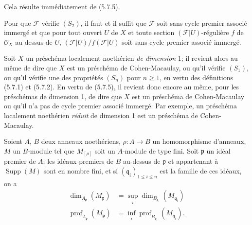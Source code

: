 Cela résulte immédiatement de (5.7.5).

\begin{corollary}[5.7.7]
\label{IV.2.s5.7.7-fr}
Pour que $\mathscr F$ vérifie $(S_2)$, il faut et il suffit que $\mathscr F$
soit sans cycle premier associé immergé et que pour tout ouvert $U$ de $X$
et toute section $(\mathscr F|U)$-régulière $f$ de $\mathcal O_X$ au-dessus
de $U$, $(\mathscr F|U)/f(\mathscr F|U)$ soit sans cycle premier associé
immergé.
\end{corollary}


\begin{remarks}[5.7.8]
\label{IV.2.s5.7.8-fr}
Soit $X$ un préschéma localement noethérien \emph{de dimension} 1; il revient alors
au même de dire que $X$ est un préschéma de Cohen-Macaulay, ou qu'il vérifie
$(S_1)$, ou qu'il vérifie une des propriétés $(S_n)$ pour $n\geq1$, en vertu
des définitions (5.7.1) et (5.7.2). En vertu de (5.7.5), il revient donc
encore au même, pour les préschémas de dimension 1, de dire que $X$ est un
préschéma de Cohen-Macaulay ou qu'il n'a pas de cycle premier associé
immergé. Par exemple, un préschéma localement noethérien \emph{réduit} de dimension
1 est un préschéma de Cohen-Macaulay.
\end{remarks}

\begin{proposition}[5.7.9]
\label{IV.2.s5.7.9-fr}
Soient $A$, $B$ deux anneaux noethériens, $\rho:A\to B$ un homomorphisme
d'anneaux, $M$ un $B$-module tel que $M_{[\rho]}$ soit un $A$-module de type
fini. Soit $\mathfrak p$ un idéal premier de $A$; les idéaux premiers de $B$
au-dessus de $\mathfrak p$ et appartenant à $\operatorname{Supp}(M)$ sont en
nombre fini, et si $(\mathfrak q_i)_{1\leq i\leq n}$ est la famille de ces
idéaux, on a
\begin{align}
\dim_{A_{\mathfrak p}}(M_{\mathfrak p})
&=\sup_i\dim_{B_{\mathfrak q_i}}(M_{\mathfrak q_i})
\tag{5.7.9.1}\label{IV.2.s5.7.9.1-fr}\\
\operatorname{prof}_{A_{\mathfrak p}}(M_{\mathfrak p})
&=\inf_i\operatorname{prof}_{B_{\mathfrak q_i}}(M_{\mathfrak q_i}).
\tag{5.7.9.2}\label{IV.2.s5.7.9.2-fr}
\end{align}
\end{proposition}

